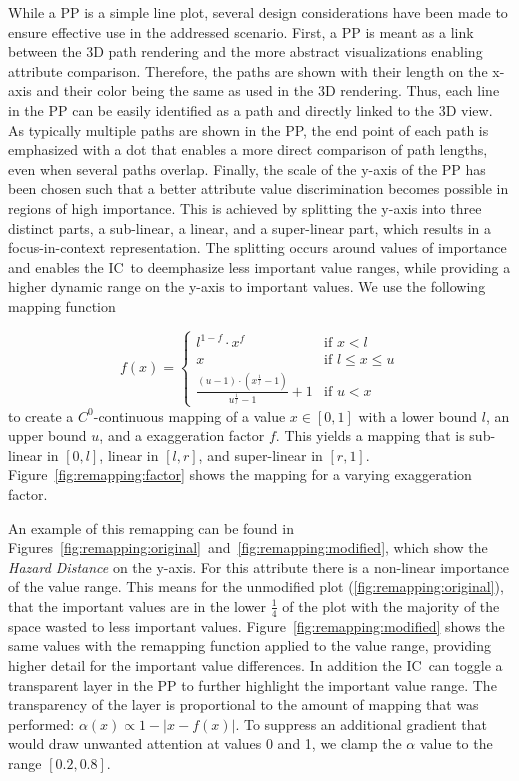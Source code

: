 \documentclass[conference,10pt,letter]{IEEEtran}
\def\IC{IC}
\begin{document}
While a PP is a simple line plot, several design considerations have been made to ensure effective use in the addressed scenario. First, a PP is meant as a link between the 3D path rendering and the more abstract visualizations enabling attribute comparison. Therefore, the paths are shown with their length on the x-axis and their color being the same as used in the 3D rendering. Thus, each line in the PP can be easily identified as a path and directly linked to the 3D view. As typically multiple paths are shown in the PP, the end point of each path is emphasized with a dot that enables a more direct comparison of path lengths, even when several paths overlap. Finally, the scale of the y-axis of the PP has been chosen such that a better attribute value discrimination becomes possible in regions of high importance. This is achieved by splitting the y-axis into three distinct parts, a sub-linear, a linear, and a super-linear part, which results in a focus-in-context representation. The splitting occurs around values of importance and enables the \IC\ to deemphasize less important value ranges, while providing a higher dynamic range on the y-axis to important values. We use the following mapping function

$$
f(x) = \left\{
    \begin{array}{ll}  
    l^{1-f} \cdot x^f & \textrm{if } x < l \\
    x & \textrm{if } l \leq x \leq u \\
    \frac{(u-1) \cdot \left( x^\frac{1}{f} - 1\right)}{u^\frac{1}{f} - 1} + 1 & \textrm{if } u < x
    \end{array}
    \right.
$$
to create a $C^0$-continuous mapping of a value $x \in [0,1]$ with a lower bound $l$, an upper bound $u$, and a exaggeration factor $f$. This yields a mapping that is sub-linear in $[0,l]$, linear in $[l,r]$, and super-linear in $[r,1]$. Figure~\ref{fig:remapping:factor} shows the mapping for a varying exaggeration factor.

An example of this remapping can be found in Figures~\ref{fig:remapping:original}~and~\ref{fig:remapping:modified}, which show the \emph{Hazard Distance} on the y-axis. For this attribute there is a non-linear importance of the value range. This means for the unmodified plot (\ref{fig:remapping:original}), that the important values are in the lower $\frac{1}{4}$ of the plot with the majority of the space wasted to less important values. Figure~\ref{fig:remapping:modified} shows the same values with the remapping function applied to the value range, providing higher detail for the important value differences. In addition the \IC\ can toggle a transparent layer in the PP to further highlight the important value range. The transparency of the layer is proportional to the amount of mapping that was performed: $\alpha(x) \propto 1 - \left| x - f(x) \right|$. To suppress an additional gradient that would draw unwanted attention at values 0 and 1, we clamp the $\alpha$ value to the range $[0.2,0.8]$.
\end{document}
